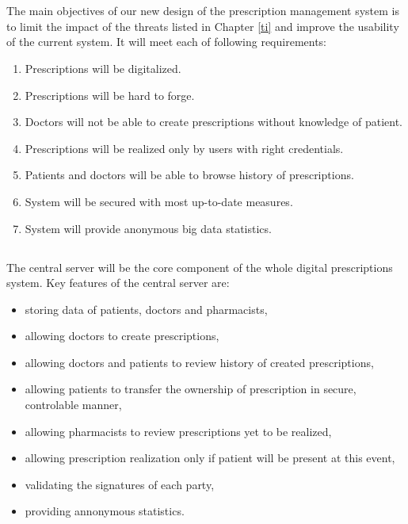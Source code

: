 \chapter{}

The main objectives of our new design of the prescription management system is to limit the impact of the threats listed in Chapter \ref{ti} and improve the usability of the current system.
It will meet each of following requirements:
\begin{enumerate}
\item Prescriptions will be digitalized.
\item Prescriptions will be hard to forge.
\item Doctors will not be able to create prescriptions without knowledge of patient.
\item Prescriptions will be realized only by users with right credentials.
\item Patients and doctors will be able to browse history of prescriptions.
\item System will be secured with most up-to-date measures.
\item System will provide anonymous big data statistics.
\end{enumerate}

\newpage
\section{}

The central server will be the core component of the whole digital prescriptions system. Key features of the central server are:
\begin{itemize}
 \item storing data of patients, doctors and pharmacists,
 \item allowing doctors to create prescriptions,
 \item allowing doctors and patients to review history of created prescriptions,
 \item allowing patients to transfer the ownership of prescription in secure, controlable manner,
 \item allowing pharmacists to review prescriptions yet to be realized,
 \item allowing prescription realization only if patient will be present at this event,
 \item validating the signatures of each party,
 \item providing annonymous statistics.
\end{itemize}

